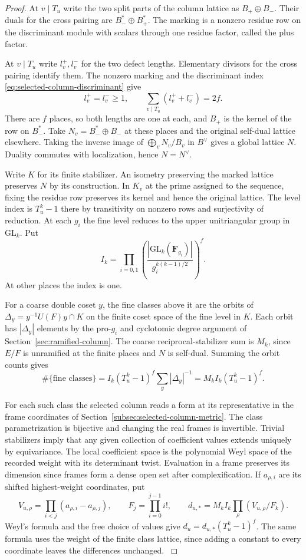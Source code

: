 \begin{proof}

At \(v\mid T_u\) write the two split parts of the column lattice as
\(B_+\oplus B_-\). Their duals for the cross pairing are
\(B_-^*\oplus B_+^*\). The marking is a nonzero residue row on the
discriminant module with scalars through one residue factor, called
the plus factor.

At \(v\mid T_u\) write \(l_v^+,l_v^-\) for the two defect lengths.
Elementary divisors for the cross pairing identify them. The nonzero
marking and the discriminant index \eqref{eq:selected-column-discriminant}
give
\[
 l_v^+=l_v^-\ge1,\qquad
 \sum_{v\mid T_u}(l_v^++l_v^-)=2f .
\]
There are \(f\) places, so both lengths are one at each, and \(B_+\) is the kernel of the row
on \(B_-^*\). Take \(N_v=B_-^*\oplus B_-\) at these places and the
original self-dual lattice elsewhere. Taking the inverse image of
\(\bigoplus_v N_v/B_v\) in \(B^\vee\) gives a global lattice \(N\).
Duality commutes with localization, hence \(N=N^\vee\).

Write \(K\) for its finite stabilizer. An isometry preserving the
marked lattice preserves \(N\) by its construction. In \(K_v\) at
the prime assigned to the sequence, fixing the residue row preserves its kernel and
hence the original lattice. The level index is \(T_u^k-1\) there
by transitivity on nonzero rows and surjectivity of reduction. At
each \(g_i\) the fine level reduces to the upper unitriangular group
in \(\mathrm{GL}_k\). Put
\[
 I_k=\prod_{i=0,1}
 \left(\frac{|\mathrm{GL}_k(\mathbf F_{g_i})|}
 {g_i^{k(k-1)/2}}\right)^f .
\]
At other places the index is one.

For a coarse double coset \(y\),
the fine classes above it are the orbits of
\(\Delta_y=y^{-1}U(F)y\cap K\) on the finite coset space of the
fine level in \(K\). Each orbit has \(|\Delta_y|\) elements by the
pro-\(g_i\) and cyclotomic degree argument of
Section~\ref{sec:ramified-column}. The coarse reciprocal-stabilizer
sum is \(M_k\), since \(E/F\) is unramified at the finite places
and \(N\) is self-dual. Summing the orbit counts gives
\[
 \#\{\text{fine classes}\}
 = I_k(T_u^k-1)^f\sum_y |\Delta_y|^{-1}
 = M_k I_k(T_u^k-1)^f .
\]

For each such class the selected column reads a form at its
representative in the frame coordinates of
Section~\ref{subsec:selected-column-metric}. The class
parametrization is bijective and changing the real frames is
invertible. Trivial stabilizers imply that any given collection of
coefficient values extends uniquely by equivariance. The local
coefficient space is the polynomial Weyl space of the recorded
weight with its determinant twist. Evaluation in a frame preserves
its dimension since frames form a dense open set after
complexification. If \(a_{\rho,i}\) are its shifted highest-weight
coordinates, put
\[
 V_{u,\rho}=\prod_{i<j}(a_{\rho,i}-a_{\rho,j}),\qquad
 F_j=\prod_{i=0}^{j-1}i!,\qquad
 d_{u,*}=M_k I_k\prod_\rho(V_{u,\rho}/F_k).
\]
Weyl's formula and the free choice of values give
\(d_u=d_{u,*}(T_u^k-1)^f\). The same formula uses the weight of the
finite class lattice, since adding a constant to every coordinate
leaves the differences unchanged.
\label{cor:selected-word-level-1}


\end{proof}
